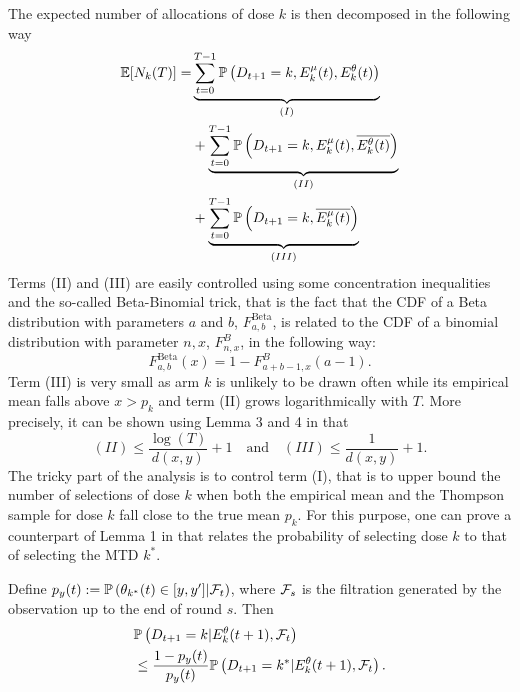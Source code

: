 The expected number of allocations of dose $k$ is then decomposed in the following way 
\begin{align*}
 \mathbb{E}[N_k(T)] = &\underbrace{\sum_{t=0}^{T-1}\mathbb{P}\left(D_{t+1} = k, E_k^\mu(t),E_k^\theta(t)\right)}_{(I)}
 \\ &
 	+ \underbrace{\sum_{t=0}^{T-1}\mathbb{P}\left(D_{t+1} = k, E_k^\mu(t),\overline{E_k^\theta(t)}\right)}_{(II)}
 \\ &
 	+ \underbrace{\sum_{t=0}^{T-1}\mathbb{P}\left(D_{t+1} = k, \overline{E_k^\mu(t)}\right)}_{(III)}  
\end{align*}
Terms (II) and (III) are easily controlled using some concentration inequalities and the so-called Beta-Binomial trick, that is the fact that the CDF of a Beta distribution with parameters $a$ and $b$, $F^{\text{Beta}}_{a,b}$, is related to the CDF of a binomial distribution with parameter $n,x$, $F^{B}_{n,x}$, in the following way: \[F^{\text{Beta}}_{a,b}(x) = 1 - F^{B}_{a+b-1, x}(a - 1).\] Term (III) is very small as arm $k$ is unlikely to be drawn often while its empirical mean falls above $x > p_k$ and term (II) grows logarithmically with $T$. More precisely, it can be shown using Lemma 3 and 4 in \cite{AGAISTAT13} that 
\[
 (II)  \leq  \frac{\log(T)}{d(x,y)} + 1 \ \ \ \text{ and } \ \ \ (III)  \leq  \frac{1}{d(x,y)} + 1.
\] 
The tricky part of the analysis is to control term (I), that is to upper bound the number of selections of dose $k$ when both the empirical mean and the Thompson sample for dose $k$ fall close to the true mean $p_k$. For this purpose, one can prove a counterpart of Lemma 1 in \cite{AGAISTAT13} that relates the probability of selecting dose $k$ to that of selecting the MTD $k^*$. 

\begin{lemma}\label{lem:CrucialAG}Define $p_{y}(t) : = \mathbb{P}\left({\theta}_{k^*}(t) \in [y,y'] | \mathcal{F}_{t}\right)$, where $\mathcal{F}_{s}$ is the filtration generated by the observation up to the end of round $s$. Then 
\begin{align*}
&\mathbb{P}\left(D_{t+1} = k | E_{k}^\theta(t+1),\mathcal{F}_{t}\right)
\\ &\leq \frac{1-p_{y}(t)}{p_y(t)}\mathbb{P}\left(D_{t+1} = k^* | E_k^\theta(t+1),\mathcal{F}_{t}\right).
\end{align*}
\end{lemma}

